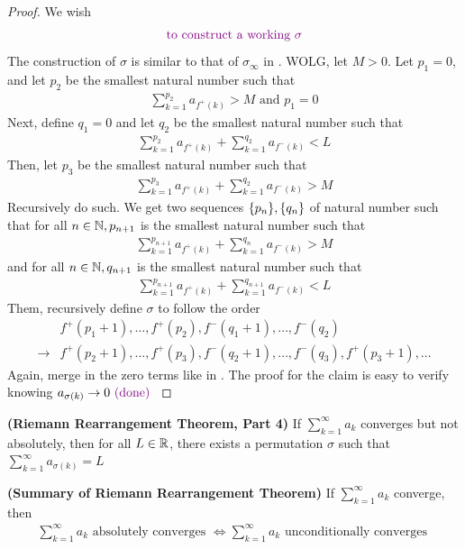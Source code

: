 \documentclass{report}
\begin{document}
\begin{proof}
We wish 
\begin{align*}
\textcolor{violet}{\text{ to construct a working $\sigma$ }}
\end{align*}
The construction of $\sigma$ is similar to that of $\sigma_{\infty}$ in . WOLG, let $M>0$. Let $p_1=0$, and let  $p_2$ be the smallest natural number such that 
 \begin{align*}
\sum_{k=1}^{p_2}a_{f^+(k)}>M\text{ and }p_1=0
\end{align*}
Next, define $q_1=0$ and let $q_2$ be the smallest natural number such that 
 \begin{align*}
\sum_{k=1}^{p_2}a_{f^+(k)}+\sum_{k=1}^{q_2} a_{f^-(k)}<L
\end{align*}
Then, let $p_3$ be the smallest natural number such that 
\begin{align*}
\sum_{k=1}^{p_3}a_{f^+(k)}+\sum_{k=1}^{q_2}a_{f^-(k)}>M
\end{align*}
Recursively do such. We get two sequences $\{ p_n \},\{ q_n \}$ of natural number such that for all $n\in\mathbb{N},p_{n+1}$ is the smallest natural number such that 
\begin{align*}
\sum_{k=1}^{p_{n+1}} a_{f^+(k)} +\sum_{k=1}^{q_n}a_{f^-(k)}>M
\end{align*}
and for all $n\in\mathbb{N},q_{n+1}$ is the smallest natural number such that 
\begin{align*}
\sum_{k=1}^{p_{n+1}}a_{f^+(k)} + \sum_{k=1}^{q_{n+1}} a_{f^-(k)}<L
\end{align*}
Them, recursively define $\sigma$ to follow the order 
\begin{align*}
&f^+(p_1+1),\dots,f^+(p_2),f^-(q_1+1),\dots ,f^-(q_2)\\
  \longrightarrow &  f^+(p_2+1),\dots ,f^+(p_3),f^-(q_2+1),\dots ,f^-(q_3),f^+(p_3+1),\dots 
\end{align*}
Again, merge in the zero terms like in   . The proof for the claim   is easy to verify knowing $a_{\sigma(k)}\to 0\textcolor{violet}{\text{ (done) }}$ 
\end{proof}
\begin{corollary}
\label{t3}
\textbf{(Riemann Rearrangement Theorem, Part 4)} If $\sum_{k=1}^\infty a_k$ converges but not absolutely, then for all $L \in\mathbb{R}$, there exists a permutation $\sigma$ such that $\sum_{k=1}^\infty a_{\sigma(k)}=L$
\end{corollary}
\begin{theorem}
\label{t4}
\textbf{(Summary of Riemann Rearrangement Theorem)} If $\sum_{k=1}^\infty a_k$ converge, then 
\begin{align*}
\sum_{k=1}^\infty a_k\text{ absolutely converges }\iff  \sum_{k=1}^\infty a_k\text{ unconditionally converges }
\end{align*}
\end{theorem}
\end{document}
